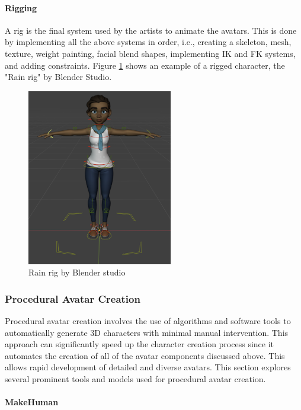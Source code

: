 \documentclass[../../main.tex]{subfiles}
\begin{document}
\paragraph{Rigging}
\label{par:rigging}

A rig is the final system used by the artists to animate the avatars. This is done by implementing all the above systems in order, i.e., creating a skeleton, mesh, texture, weight painting, facial blend shapes, implementing IK and FK systems, and adding constraints. Figure \ref{fig:rig_example} shows an example of a rigged character, the "Rain rig" by Blender Studio.

\begin{figure} 
  \centering \includegraphics[width = 2.5in]{chapters/background_work/images/rig_example.png} 
  \caption{Rain rig by Blender studio} 
  \label{fig:rig_example} 
\end{figure}

\subsubsection{Procedural Avatar Creation}
\label{subsubsec:procedural_avatar_creation}

Procedural avatar creation involves the use of algorithms and software tools to automatically generate 3D characters with minimal manual intervention. This approach can significantly speed up the character creation process since it automates the creation of all of the avatar components discussed above. This allows rapid development of detailed and diverse avatars. This section explores several prominent tools and models used for procedural avatar creation.

\paragraph{MakeHuman}
\label{par:makehuman}
\end{document}
